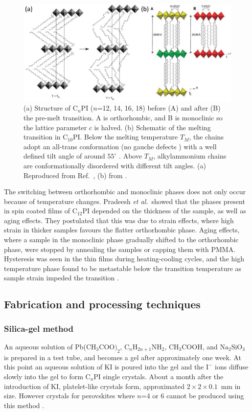 \begin{figure} [ht]
\centering
\includegraphics[width=\textwidth]{Fig4}
\caption {(a) Structure of $\textrm{C}_{n}$PI ($n$=12, 14, 16, 18) before (A) and after (B) the pre-melt transition. A is orthorhombic, and B is monoclinic so the lattice parameter $c$ is halved. (b) Schematic of the melting transition in $\textrm{C}_{10}$PI. Below the melting temperature $T_M$, the chains adopt an all-trans conformation (no gauche defects \cite{Naik2010}) with a well defined tilt angle of around $55^{\circ}$ \cite{Venkataraman2002, Venkataraman2002a}. Above $T_M$, alkylammonium chains are conformationally disordered with different tilt angles. (a) Reproduced from Ref.\ \cite{Billing2008}, (b) from \cite{Barman2003}.}
\label{2Fig4}
\end{figure}

The switching between orthorhombic and monoclinic phases does not only occur because of temperature changes. Pradeesh \textit{et al.}\ showed that the phases present in spin coated films of $\textrm{C}_{12}$PI depended on the thickness of the sample, as well as aging effects. They postulated that this was due to strain effects, where high strain in thicker samples favours the flatter orthorhombic phase. Aging effects, where a sample in the monoclinic phase gradually shifted to the orthorhombic phase, were stopped by annealing the samples or capping them with PMMA. Hysteresis was seen in the thin films during heating-cooling cycles, and the high temperature phase found to be metastable below the transition temperature as sample strain impeded the transition \cite{Pradeesh2009}.

\subsection{Fabrication and processing techniques}
\subsubsection{Silica-gel method}
An aqueous solution of Pb($\textrm{CH}_3 \textrm{COO)}_2$, $\textrm{C}_n\textrm{H}_{2n+1}\textrm{NH}_2$, $\textrm{CH}_3$COOH, and $\textrm{Na}_2\textrm{SiO}_3$ is prepared in a test tube, and becomes a gel after approximately one week. At this point an aqueous solution of KI is poured into the gel and the $\textrm{I}^-$ ions diffuse slowly into the gel to form $\textrm{C}_n$PI single crystals. About a month after the introduction of KI, platelet-like crystals form, approximated $2\times 2\times 0.1$~mm in size. However crystals for perovskites where $n$=4 or 6 cannot be produced using this method \cite{Ishihara1990}.

